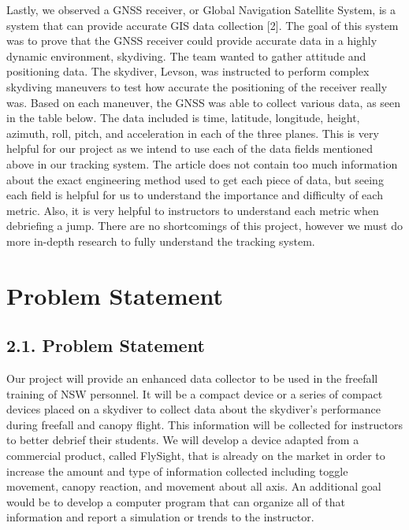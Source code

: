 \documentclass[10pt]{article}
\begin{document}
Lastly, we observed a GNSS receiver, or Global Navigation Satellite System, is a system that can provide accurate GIS data collection [2]. The goal of this system was to prove that the GNSS receiver could provide accurate data in a highly dynamic environment, skydiving. The team wanted to gather attitude and positioning data. The skydiver, Levson, was instructed to perform complex skydiving maneuvers to test how accurate the positioning of the receiver really was. Based on each maneuver, the GNSS was able to collect various data, as seen in the table below. The data included is time, latitude, longitude, height, azimuth, roll, pitch, and acceleration in each of the three planes. This is very helpful for our project as we intend to use each of the data fields mentioned above in our tracking system. The article does not contain too much information about the exact engineering method used to get each piece of data, but seeing each field is helpful for us to understand the importance and difficulty of each metric. Also, it is very helpful to instructors to understand each metric when debriefing a jump. There are no shortcomings of this project, however we must do more in-depth research to fully understand the tracking system.



\section{Problem Statement}



\subsection{2.1. Problem Statement}

Our project will provide an enhanced data collector to be used in the freefall training of NSW personnel. It will be a compact device or a series of compact devices placed on a skydiver to collect data about the skydiver’s performance during freefall and canopy flight. This information will be collected for instructors to better debrief their students. We will develop a device adapted from a commercial product, called FlySight, that is already on the market in order to increase the amount and type of information collected including toggle movement, canopy reaction, and movement about all axis. An additional goal would be to develop a computer program that can organize all of that information and report a simulation or trends to the instructor.
\end{document}
